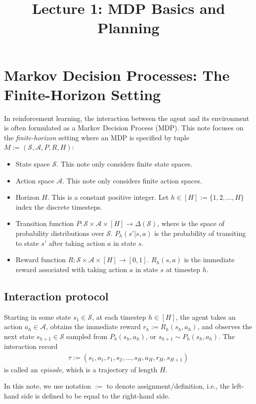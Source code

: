 \title{Lecture 1: MDP Basics and Planning}

\section{Markov Decision Processes: The Finite-Horizon Setting}
In reinforcement learning, the interaction between the agent and its environment is often formulated as a Markov Decision Process (MDP).
This note focuses on the {\em finite-horizon} setting where an MDP is specified by tuple $M:=(\mathcal{S},\mathcal{A}, P, R, H)$:
\begin{itemize}
    \item State space $\mathcal{S}$. This note only considers finite state spaces.
    \item Action space $\mathcal{A}$. This note only considers finite action spaces.
    \item Horizon $H$. This is a constant positive integer. Let $h\in[H]:=\{1,2,\ldots,H\}$ index the discrete timesteps.
    \item Transition function $P:\mathcal{S}\times\mathcal{A}\times[H]\to\Delta(\mathcal{S})$, where is the space of probability distributions over $\mathcal{S}$. $P_h(s'|s,a)$ is the probability of transiting to state $s'$ after taking action $a$ in state $s$.
    \item Reward function $R:\mathcal{S}\times\mathcal{A}\times[H]\to[0,1]$. $R_h(s,a)$ is the  immediate reward associated with taking action $a$ in state $s$ at timestep $h$. 
\end{itemize}

\subsection{Interaction protocol}
Starting in some state $s_1\in\mathcal{S}$, at each timestep $h\in[H]$, the agent takes an action $a_h \in \mathcal{A}$, obtains the immediate reward $r_h:=R_h(s_h, a_h)$, and observes the next state $s_{h+1}\in\mathcal{S}$ sampled from $P_h(s_h, a_h)$, or $s_{h+1} \sim P_h\left(s_h, a_h\right)$. The interaction record
\begin{align*}
    \tau:=\left(s_1, a_1, r_1, s_2, \ldots, s_H, a_H, r_H, s_{H+1}\right)
\end{align*}
is called an {\em episode}, which is a trajectory of length $H$.

In this note, we use notation $:=$ to denote assignment/definition, i.e., the left-hand side is defined to be equal to the right-hand side.

